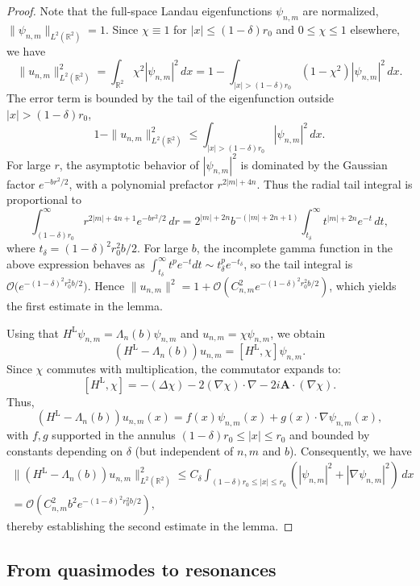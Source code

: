 \documentclass[11pt]{amsart}
\theoremstyle{remark}
\newcommand{\bA}{\mathbf{A}}
\newcommand{\R}{\mathbb{R}}
\numberwithin{equation}{section}
\begin{document}
\begin{proof}
Note that the full-space Landau eigenfunctions $\psi_{n,m}$ are normalized,
$\|\psi_{n,m}\|_{L^2(\mathbb{R}^2)} = 1$.  
Since $\chi \equiv 1$ for $|x| \le (1-\delta)r_0$ and $0 \le \chi \le 1$ elsewhere, we have  
\[
\|u_{n,m}\|^2_{L^2(\R^2)} = \int_{\mathbb{R}^2} \chi^2 |\psi_{n,m}|^2 \, dx 
= 1 - \int_{|x| > (1-\delta)r_0} (1-\chi^2) |\psi_{n,m}|^2 \, dx.
\]  
The error term is bounded by the tail of the eigenfunction outside $|x| > (1-\delta)r_0$,
\[
1 - \|u_{n,m}\|^2_{L^2(\R^2)} \le \int_{|x| > (1-\delta)r_0} |\psi_{n,m}|^2 \, dx.
\]  
For large $r$, the asymptotic behavior of $|\psi_{n,m}|^2$ is dominated by the Gaussian factor $e^{-b r^2/2}$, with a polynomial prefactor $r^{2|m|+4n}$.  
Thus the radial tail integral is proportional to  
\[
\int_{(1-\delta)r_0}^\infty r^{2|m|+4n+1} e^{-b r^2/2} \, dr
= 2^{|m|+2n} b^{-(|m|+2n+1)} \int_{t_\delta}^\infty t^{|m|+2n} e^{-t} \, dt,
\]  
where $t_\delta =  (1-\delta)^2 r_0^2b / 2$.  
For large $b$, the incomplete gamma function  in the above expression
 behaves as $\int_{t_\delta}^\infty t^p e^{-t} dt \sim t_\delta^p e^{-t_\delta}$, so the tail integral is $\mathcal{O}\big( e^{-(1-\delta)^2 r_0^2b/2} \big)$.  
Hence $\|u_{n,m}\|^2 = 1 + \mathcal{O}(C_{n,m}^2e^{- (1-\delta)^2 r_0^2b/2})$, which yields the first estimate in the lemma.\medskip

Using that $H^{\text{L}}\psi_{n,m} = \Lambda_n(b)\psi_{n,m}$ and $u_{n,m} = \chi \psi_{n,m}$, we obtain
\[
(H^{\text{L}}-\Lambda_n(b))u_{n,m} = [H^{\text{L}}, \chi] \psi_{n,m}.
\]
Since $\chi$ commutes with multiplication, the commutator expands to:
\[
[H^{\text{L}}, \chi] = -(\Delta \chi) - 2(\nabla \chi) \cdot \nabla - 2i\bA \cdot (\nabla \chi).
\]
Thus,
\[
(H^{\text{L}}-\Lambda_n(b))u_{n,m}(x) = f(x) \psi_{n,m}(x) + g(x) \cdot \nabla \psi_{n,m}(x),
\]
with $f,g$ supported in the annulus $(1-\delta)r_0 \le |x| \le r_0$ and bounded by constants depending on $\delta$ (but independent of $n,m$ and $b$). Consequently, we have
\begin{multline*}
\|(H^{\text{L}}-\Lambda_n(b))u_{n,m}\|_{L^2(\R^2)}^2 \le C_\delta\int_{(1-\delta)r_0 \le |x| \le r_0} (|\psi_{n,m}|^2 + |\nabla \psi_{n,m}|^2) \, dx\\
=\mathcal O(C_{n,m}^2b^2e^{-(1-\delta)^2r_0^2b/2}),
\end{multline*}
thereby establishing the second estimate in the lemma.
\end{proof}



\subsection{From quasimodes to resonances}\label{sec:resonances}
\end{document}
